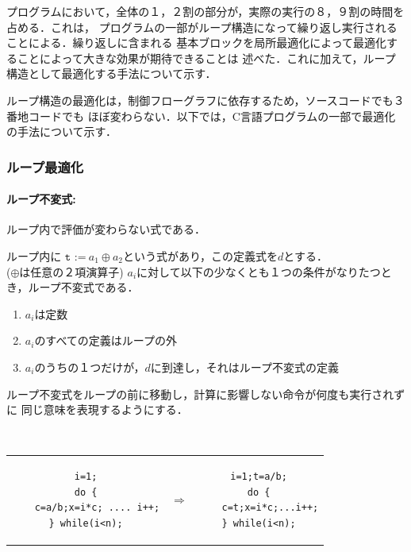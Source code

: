 \documentclass[dvipdfmx,a4j]{jbook}
\begin{document}
プログラムにおいて，全体の１，２割の部分が，実際の実行の８，９割の時間を占める．これは，
プログラムの一部がループ構造になって繰り返し実行されることによる．繰り返しに含まれる
基本ブロックを局所最適化によって最適化することによって大きな効果が期待できることは
述べた．これに加えて，ループ構造として最適化する手法について示す．

ループ構造の最適化は，制御フローグラフに依存するため，ソースコードでも３番地コードでも
ほぼ変わらない．以下では，C言語プログラムの一部で最適化の手法について示す．


\subsubsection{ループ最適化}

\paragraph{ループ不変式:}
    ループ内で評価が変わらない式である．
    \begin{trivlist}
        \item[ループ不変式の移動:]
        ループ内に $\texttt{t :=}\ a_1 \oplus a_2$という式があり，この定義式を$d$とする．\\ ($\oplus$は任意の２項演算子)
        $a_i$に対して以下の少なくとも１つの条件がなりたつとき，ループ不変式である．
        \begin{enumerate}
        \item $a_i$は定数
        \item $a_i$のすべての定義はループの外
        \item $a_i$のうちの１つだけが，$d$に到達し，それはループ不変式の定義
        \end{enumerate}
    \end{trivlist}

ループ不変式をループの前に移動し，計算に影響しない命令が何度も実行されずに
同じ意味を表現するようにする．

\begin{Exmp}\ \\[10pt]
\begin{tabular}{ccc}
\begin{minipage}{.35\linewidth}
\begin{Verbatim}
i=1;
do {
    c=a/b;x=i*c; .... i++;
} while(i<n);
\end{Verbatim}
\end{minipage}
 &
$\Rightarrow$
&
\begin{minipage}{.35\linewidth}
\begin{Verbatim}
i=1;t=a/b;
do {
    c=t;x=i*c;...i++;
} while(i<n);
\end{Verbatim}
\end{minipage}
\end{tabular}
\end{Exmp}
\end{document}
